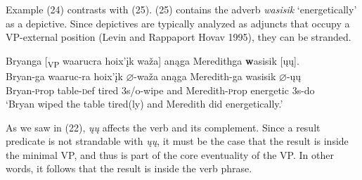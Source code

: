 \documentclass[output=paper]{LSP/langsci}
\begin{document}
\begin{exe}
\ex
\begin{xlist}



\end{xlist}
\end{exe}

Example (24) contrasts with (25).  (25) contains the adverb \emph{wasisik} `energetically' as a depictive. Since depictives are typically analyzed as adjuncts that occupy a VP-external position (Levin and Rappaport Hovav 1995), they can be stranded.

\begin{exe}

\ex \glll Bryanga [\textsubscript{VP} waarucra hoix'\k{i}k wa\v{z}a\textsc] an\k{a}ga  Meredithga {\textbf wasisik} [\k{u}\k{u}]. \\
 Bryan-ga {} waaruc-ra hoix'\k{i}k $\varnothing$-wa\v{z}a an\k{a}ga Meredith-ga  wasisik $\varnothing$-\k{u}\k{u}\\
Bryan-{\textsc prop} {} table-{\textsc def} tired {\textsc 3s/o}-wipe and Meredith-{\textsc prop}  energetic {\textsc 3s}-do\\
\glt `Bryan wiped the table tired(ly) and Meredith did energetically.'

\end{exe}

As we saw in (22), \textit{\k{u}\k{u}} affects the verb and its complement. Since a result predicate is not strandable with \textit{\k{u}\k{u}}, it must be the case that the result is inside the minimal VP, and thus is part of the core eventuality of the VP. In other words, it follows that the result is inside the verb phrase.
\end{document}
